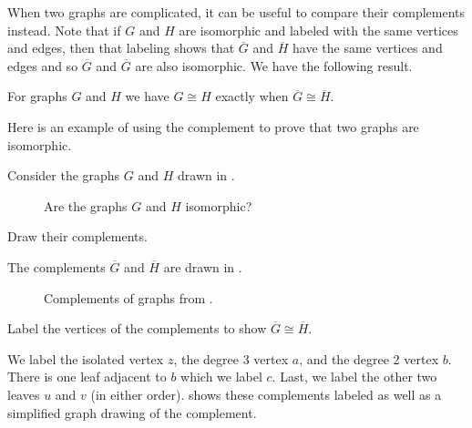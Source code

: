 When two graphs are complicated, it can be useful to compare their complements instead.  Note that if $G$ and $H$ are isomorphic and labeled with the same vertices and edges, then that labeling shows that $\overline{G}$ and $\overline{H}$ have the same vertices and edges and so $\overline{G}$ and $\overline{G}$ are also isomorphic.  We have the following result.

\begin{thm}
\label{thm_ism_complement}
    For graphs $G$ and $H$ we have $G \cong H$ exactly when $\overline{G} \cong \overline{H}$.
\end{thm}

Here is an example of using the complement to prove that two graphs are isomorphic.

\begin{exam}
\label{exam_prove_ism_complements}
    Consider the graphs $G$ and $H$ drawn in . 
        \begin{figure}[hbtp]
            \centering
            
            \caption{Are the graphs $G$ and $H$ isomorphic?}
            \label{fig_ism_Ham6}
        \end{figure}
        \begin{apart}
            \item Draw their complements.
                \begin{soln}
                    The complements $\overline{G}$ and $\overline{H}$ are drawn in .
                    \begin{figure}[hbtp]
                        \centering
                        
                        \caption{Complements of graphs from .}
                        \label{fig_ism_Ham6_comp}
                    \end{figure}
                \end{soln}
            \item Label the vertices of the complements to show  $\overline{G} \cong \overline{H}$.
                \begin{soln}
                    We label the isolated vertex $z$, the degree 3 vertex $a$, and the degree 2 vertex $b$.  There is one leaf adjacent to $b$ which we label $c$.  Last, we label the other two leaves $u$ and $v$ (in either order).  shows these complements labeled as well as a simplified graph drawing of the complement.

\end{soln}
\end{apart}
\end{exam}

